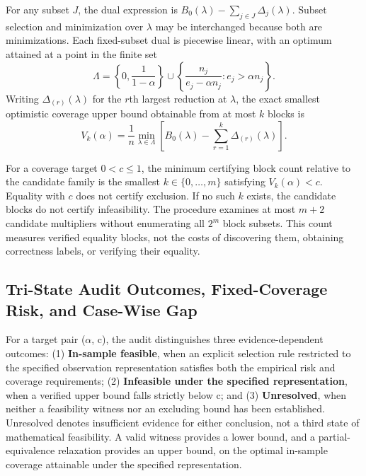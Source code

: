 \documentclass[letterpaper]{article}
\begin{document}
For any subset \(J\), the dual expression is
\(B_0(\lambda)-\sum_{j\in J}\Delta_j(\lambda)\).
Subset selection and minimization over \(\lambda\) may be interchanged because both are minimizations. Each fixed-subset dual is piecewise linear, with an optimum attained at a point in the finite set
\[
\Lambda=
\left\{0,\frac{1}{1-\alpha}\right\}
\cup
\left\{
\frac{n_j}{e_j-\alpha n_j}:
e_j>\alpha n_j
\right\}.
\]
Writing \(\Delta_{(r)}(\lambda)\) for the \(r\)th largest reduction at \(\lambda\), the exact smallest optimistic coverage upper bound obtainable from at most \(k\) blocks is
\[
V_k(\alpha)=
\frac{1}{n}\min_{\lambda\in\Lambda}
\left[
B_0(\lambda)-
\sum_{r=1}^{k}\Delta_{(r)}(\lambda)
\right].
\]

For a coverage target \(0<c\leq1\), the minimum certifying block count relative to the candidate family is the smallest \(k\in\{0,\ldots,m\}\) satisfying \(V_k(\alpha)<c\). Equality with \(c\) does not certify exclusion. If no such \(k\) exists, the candidate blocks do not certify infeasibility. The procedure examines at most \(m+2\) candidate multipliers without enumerating all \(2^m\) block subsets. This count measures verified equality blocks, not the costs of discovering them, obtaining correctness labels, or verifying their equality.

\subsection{Tri-State Audit Outcomes, Fixed-Coverage Risk, and Case-Wise Gap}

For a target pair ($\alpha$, c), the audit distinguishes three evidence-dependent outcomes: (1) \textbf{In-sample feasible}, when an explicit selection rule restricted to the specified observation representation satisfies both the empirical risk and coverage requirements; (2) \textbf{Infeasible under the specified representation}, when a verified upper bound falls strictly below c; and (3) \textbf{Unresolved}, when neither a feasibility witness nor an excluding bound has been established. Unresolved denotes insufficient evidence for either conclusion, not a third state of mathematical feasibility. A valid witness provides a lower bound, and a partial-equivalence relaxation provides an upper bound, on the optimal in-sample coverage attainable under the specified representation.
\end{document}
